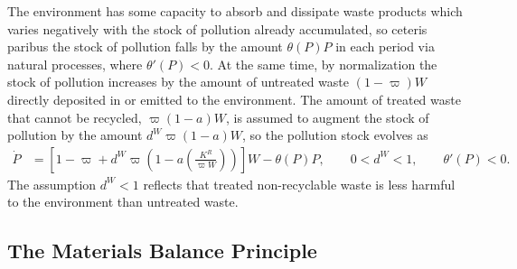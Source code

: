 The environment has some capacity to absorb and dissipate waste products which varies negatively with the stock of pollution already accumulated, so ceteris paribus the stock of pollution falls by the amount $\theta(P)P$ in each period via natural processes, where $\theta'(P) < 0$. At the same time, by normalization the stock of pollution increases by the amount of untreated waste $(1-\varpi)W$ directly deposited in or emitted to the environment. The amount of treated waste that cannot be recycled, $\varpi(1-a)W$, is assumed to augment the stock of pollution by the amount $d^W \varpi(1-a)W$, so the pollution stock evolves as
\begin{align}
\dot{P} &= \left[1 - \varpi + d^W\varpi\left(1 - a\left(\frac{K^R}{\varpi W}\right)\right)\right] W - \theta(P)P, \qquad 0 < d^W < 1, \qquad \theta'(P)<0.
\label{eq:ramsey:pollution-motion}
\end{align}
The assumption $d^W < 1$ reflects that treated non-recyclable waste is less harmful to the environment than untreated waste.

\subsection{The Materials Balance Principle}
\label{subsec:model-setup:materials-balance}


